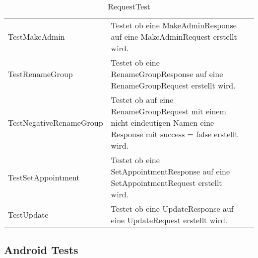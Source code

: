 \begin{table}[H]
{\begin{tabular}{|p{}|p{}|>{\centering}p{}|}
					\hspace{0pt}TestMakeAdmin & Testet ob eine MakeAdminResponse auf eine MakeAdminRequest erstellt wird. &	\checkmark\tabularnewline
					\hspace{0pt}TestRenameGroup & Testet ob eine RenameGroupResponse auf eine RenameGroupRequest erstellt wird. &	\checkmark\tabularnewline
					\hspace{0pt}TestNegativeRenameGroup & Testet ob auf eine RenameGroupRequest mit einem nicht eindeutigen Namen eine Response mit success = false erstellt wird. &	\checkmark\tabularnewline
					\hspace{0pt}TestSetAppointment & Testet ob eine SetAppointmentResponse auf eine SetAppointmentRequest erstellt wird. &	\checkmark\tabularnewline
					\hspace{0pt}TestUpdate & Testet ob eine UpdateResponse auf eine UpdateRequest erstellt wird. &	\checkmark\tabularnewline
				
					\hline
				\end{tabular}}
				\caption{RequestTest}
			\end{table}
			

\subsection{Android Tests}
